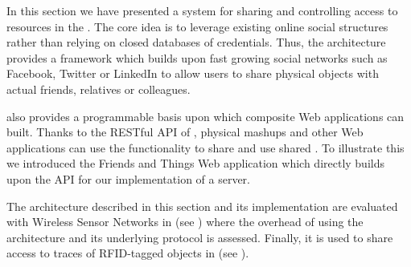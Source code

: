 In this section we have presented a system for sharing and controlling access to resources in the \WoTLong{}. The core idea is to leverage existing online social structures rather than relying on closed databases of credentials. Thus, the \sac{} architecture provides a framework which builds upon fast growing social networks such as Facebook, Twitter or LinkedIn to allow users to share physical objects with actual friends, relatives or colleagues.

\sac{} also provides a programmable basis upon which composite Web applications can built. Thanks to the RESTful API of \sac{}, physical mashups and other Web applications can use the \sac{} functionality to share and use shared \sts{}. To illustrate this we introduced the Friends and Things Web application which directly builds upon the API for our implementation of a \sac{} server.

The architecture described in this section and its implementation are evaluated with Wireless Sensor Networks in  (see ) where the overhead of using the architecture and its underlying protocol is assessed. Finally, it is used to share access to traces of RFID-tagged objects in  (see ).

\newpage
